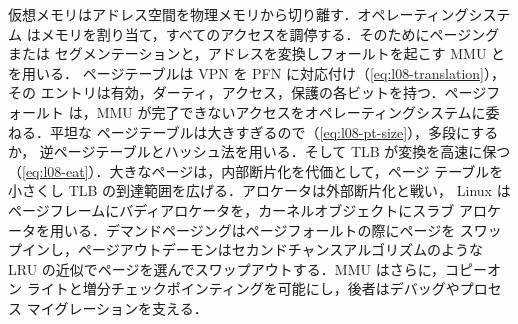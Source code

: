 \documentclass[../main.tex]{subfiles}
\begin{document}

\begin{keypoint}[章のまとめ]
  仮想メモリはアドレス空間を物理メモリから切り離す．オペレーティングシステム
  はメモリを割り当て，すべてのアクセスを調停する．そのためにページングまたは
  セグメンテーションと，アドレスを変換しフォールトを起こす MMU とを用いる．
  ページテーブルは VPN を PFN に対応付け（\cref{eq:l08-translation}），その
  エントリは有効，ダーティ，アクセス，保護の各ビットを持つ．ページフォールト
  は，MMU が完了できないアクセスをオペレーティングシステムに委ねる．平坦な
  ページテーブルは大きすぎるので（\cref{eq:l08-pt-size}），多段にするか，
  逆ページテーブルとハッシュ法を用いる．そして TLB が変換を高速に保つ
  （\cref{eq:l08-eat}）．大きなページは，内部断片化を代価として，ページ
  テーブルを小さくし TLB の到達範囲を広げる．アロケータは外部断片化と戦い，
  Linux はページフレームにバディアロケータを，カーネルオブジェクトにスラブ
  アロケータを用いる．デマンドページングはページフォールトの際にページを
  スワップインし，ページアウトデーモンはセカンドチャンスアルゴリズムのような
  LRU の近似でページを選んでスワップアウトする．MMU はさらに，コピーオン
  ライトと増分チェックポインティングを可能にし，後者はデバッグやプロセス
  マイグレーションを支える．
\end{keypoint}
\end{document}
